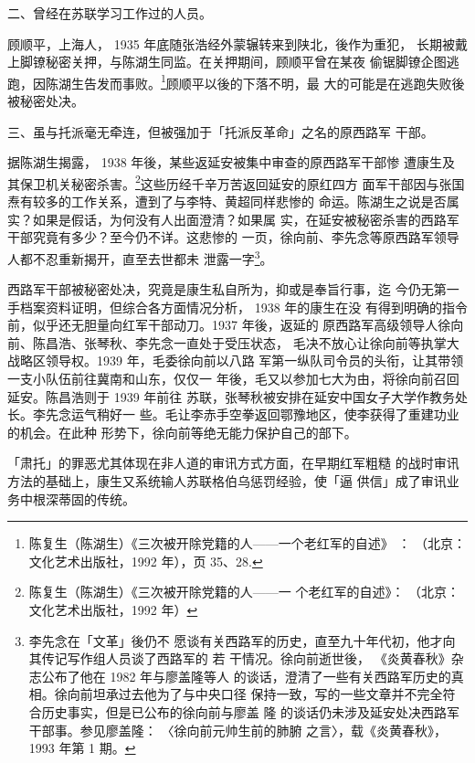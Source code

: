 二、曾经在苏联学习工作过的人员。

顾顺平，上海人， 1935 年底随张浩经外蒙辗转来到陕北，後作为重犯，
长期被戴上脚镣秘密关押，与陈湖生同监。在关押期间，顾顺平曾在某夜
偷锯脚镣企图逃跑，因陈湖生告发而事败。\footnote{陈复生（陈湖生）《三次被开除党籍的人——一个老红军的自述》
：
（北京：文化艺术出版社，1992 年），页 35、28.}顾顺平以後的下落不明，最
大的可能是在逃跑失败後被秘密处决。

三、虽与托派毫无牵连，但被强加于「托派反革命」之名的原西路军
干部。

据陈湖生揭露， 1938 年後，某些返延安被集中审查的原西路军干部惨 遭康生及
其保卫机关秘密杀害。\footnote{陈复生（陈湖生）《三次被开除党籍的人——一
个老红军的自述》： （北京：文化艺术出版社，1992 年）}这些历经千辛万苦返回延安的原红四方 面军干部因与张国
焘有较多的工作关系，遭到了与李特、黄超同样悲惨的 命运。陈湖生之说是否属
实？如果是假话，为何没有人出面澄清？如果属 实，在延安被秘密杀害的西路军
干部究竟有多少？至今仍不详。这悲惨的 一页，徐向前、李先念等原西路军领导
人都不忍重新揭开，直至去世都未 泄露一字\footnote{李先念在「文革」後仍不
愿谈有关西路军的历史，直至九十年代初，他才向其传记写作组人员谈了西路军的
若 干情况。徐向前逝世後， 《炎黄春秋》杂志公布了他在 1982 年与廖盖隆等人
的谈话，澄清了一些有关西路军历史的真 相。徐向前坦承过去他为了与中央口径
保持一致，写的一些文章并不完全符合历史事实，但是已公布的徐向前与廖盖 隆
的谈话仍未涉及延安处决西路军干部事。参见廖盖隆： 〈徐向前元帅生前的肺腑
之言〉，载《炎黄春秋》，1993 年第 1 期。}。
 
西路军干部被秘密处决，究竟是康生私自所为，抑或是奉旨行事，迄
今仍无第一手档案资料证明，但综合各方面情况分析， 1938 年的康生在没
有得到明确的指令前，似乎还无胆量向红军干部动刀。1937 年後，返延的
原西路军高级领导人徐向前、陈昌浩、张琴秋、李先念一直处于受压状态，
毛决不放心让徐向前等执掌大战略区领导权。1939 年，毛委徐向前以八路
军第一纵队司令员的头衔，让其带领一支小队伍前往冀南和山东，仅仅一
年後，毛又以参加七大为由，将徐向前召回延安。陈昌浩则于 1939 年前往
苏联，张琴秋被安排在延安中国女子大学作教务处长。李先念运气稍好一
些。毛让李赤手空拳返回鄂豫地区，使李获得了重建功业的机会。在此种
形势下，徐向前等绝无能力保护自己的部下。

「肃托」的罪恶尤其体现在非人道的审讯方式方面，在早期红军粗糙
的战时审讯方法的基础上，康生又系统输人苏联格伯乌惩罚经验，使「逼
供信」成了审讯业务中根深蒂固的传统。

